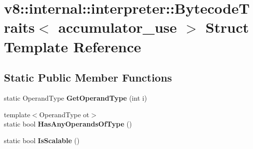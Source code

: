 \hypertarget{structv8_1_1internal_1_1interpreter_1_1_bytecode_traits_3_01accumulator__use_01_4}{}\section{v8\+:\+:internal\+:\+:interpreter\+:\+:Bytecode\+Traits$<$ accumulator\+\_\+use $>$ Struct Template Reference}
\label{structv8_1_1internal_1_1interpreter_1_1_bytecode_traits_3_01accumulator__use_01_4}
\subsection*{Static Public Member Functions}
\begin{DoxyCompactItemize}
\item 
static Operand\+Type {\bfseries Get\+Operand\+Type} (int i)\hypertarget{structv8_1_1internal_1_1interpreter_1_1_bytecode_traits_3_01accumulator__use_01_4_a9f33867e5fb308e56e2928102ac7e4ba}{}\label{structv8_1_1internal_1_1interpreter_1_1_bytecode_traits_3_01accumulator__use_01_4_a9f33867e5fb308e56e2928102ac7e4ba}

\item 
{\footnotesize template$<$Operand\+Type ot$>$ }\\static bool {\bfseries Has\+Any\+Operands\+Of\+Type} ()\hypertarget{structv8_1_1internal_1_1interpreter_1_1_bytecode_traits_3_01accumulator__use_01_4_abe16c113f5f796ba90ae9b9b689496bd}{}\label{structv8_1_1internal_1_1interpreter_1_1_bytecode_traits_3_01accumulator__use_01_4_abe16c113f5f796ba90ae9b9b689496bd}

\item 
static bool {\bfseries Is\+Scalable} ()\hypertarget{structv8_1_1internal_1_1interpreter_1_1_bytecode_traits_3_01accumulator__use_01_4_a6202279544c4661290d3a8b880691810}{}\label{structv8_1_1internal_1_1interpreter_1_1_bytecode_traits_3_01accumulator__use_01_4_a6202279544c4661290d3a8b880691810}

\end{DoxyCompactItemize}
